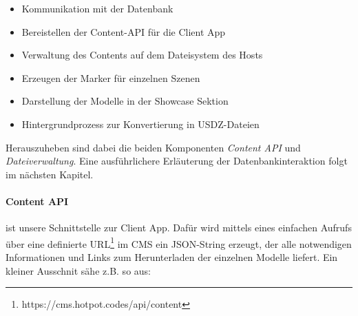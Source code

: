 \documentclass[titlepage, a4paper, 11pt]{scrartcl}
\begin{document}
        \begin{itemize}
          \item Kommunikation mit der Datenbank
          \item Bereistellen der Content-API für die Client App
          \item Verwaltung des Contents auf dem Dateisystem des Hosts
          \item Erzeugen der Marker für einzelnen Szenen
          \item Darstellung der Modelle in der Showcase Sektion
          \item Hintergrundprozess zur Konvertierung in USDZ-Dateien
        \end{itemize}

        Herauszuheben sind dabei die beiden Komponenten \textit{Content API} und \textit{Dateiverwaltung}. 
        Eine ausführlichere Erläuterung der Datenbankinteraktion folgt im nächsten Kapitel.

        \paragraph{Content API} ist unsere Schnittstelle zur Client App. Dafür wird mittels eines einfachen Aufrufs über eine definierte URL\footnote{https://cms.hotpot.codes/api/content}
        im CMS ein JSON-String erzeugt, der alle notwendigen Informationen und Links zum Herunterladen der einzelnen Modelle liefert. Ein kleiner Ausschnit sähe z.B. so aus:
\end{document}
